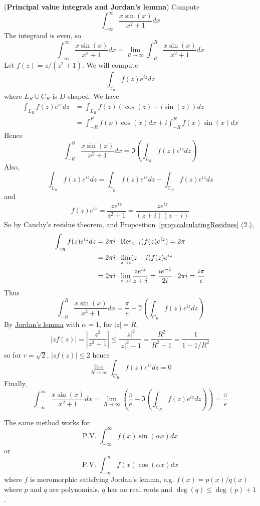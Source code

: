 \begin{example}
	(\textbf{Principal value integrals and Jordan's lemma}) Compute
	\[
		\int_{-\infty}^{\infty} \frac{x \sin(x)}{x^2 + 1} dx
	\]
	The integrand is even, so
	\[
		\int_{-\infty}^{\infty} \frac{x \sin(x)}{x^2 + 1} dx = \lim_{R \to \infty} \int_{-R}^{R} \frac{x \sin(x)}{x^2 + 1} dx
	\]
	Let $f(z) = z / (z^2 + 1)$. We will compute
	\[
		\int_{\gamma _R} f(z) e^{iz} dz
	\]
	where $L_R \cup C_R$ is $D$-shaped. We have
	\[
		\begin{aligned}
			\int_{L_R} f(z) e^{iz} dz & = \int_{L_R} f(z) (\cos(z) + i \sin(z)) dz \\
			& = \int_{-R}^{R} f(x) \cos(x) dx + i \int_{-R}^{R} f(x) \sin(x) dx
		\end{aligned}
	\]
	Hence
	\[
		\int_{-R}^{R} \frac{x \sin(x)}{x^2 + 1} dx = \Im\left( \int_{L_R} f(z) e^{iz} dz \right)
	\]
	Also,
	\[
		\int_{L_R} f(z) e^{iz} dz = \int_{\gamma_R} f(z) e^{iz} dz - \int_{C_R} f(z) e^{iz} dz
	\]
	and
	\[
		f(z) e^{iz} = \frac{z e^{iz}}{z^2 + 1} = \frac{z e^{iz}}{(z + i)(z - i)}
	\]
	So by Cauchy's residue theorem, and Proposition~\ref{prop:calculatingResidues} (2.),
	\[
		\begin{aligned}
			\int_{\gamma_R} f(z) e^{iz} dz & = 2 \pi i \cdot \text{Res}_{z = i} (f(z) e^{iz}) = 2 \pi \\
			& = 2 \pi i \cdot \lim_{z \to i} (z - i) f(z) e^{iz} \\
			& = 2 \pi i \cdot \lim_{z \to i} \frac{z e^{iz}}{z + i} = \frac{i e^{-1}}{2i} \cdot 2 \pi i = \frac{i\pi}{e}
		\end{aligned}
	\]
	Thus
	\[
		\int_{-R}^{R} \frac{x \sin(x)}{x^2 + 1} dx = \frac{\pi}{e} - \Im\left( \int_{C_R} f(z) e^{iz} dz \right)
	\]
	By \hyperref[lem:jordansLemma]{Jordan's lemma} with $\alpha = 1$, for $|z| = R$,
	\[
		|z f(z)| = \left| \frac{z^2}{z^2 + 1} \right| \le \frac{|z|^2}{|z|^2 - 1} = \frac{R^2}{R^2 - 1} = \frac{1}{1 - 1/R^2}
	\]
	so for $r = \sqrt{2}$, $|z f(z)| \le 2$ hence
	\[
		\lim_{R \to \infty} \int_{C_R} f(z) e^{iz} dz = 0
	\]
	Finally,
	\[
		\int_{-\infty}^{\infty} \frac{x \sin(x)}{x^2 + 1} dx = \lim_{R \to \infty} \left( \frac{\pi}{e} - \Im \left(\int_{C_R} f(z) e^{iz} dz \right) \right) = \frac{\pi}{e}
	\]
\end{example}

\begin{remark}
	The same method works for
	\[
		\text{P.V. } \int_{-\infty}^{\infty} f(x) \sin(\alpha x) dx
	\]
	or
	\[
		\text{P.V. } \int_{-\infty}^{\infty} f(x) \cos(\alpha x) dx
	\]
	where $f$ is meromorphic satisfying Jordan's lemma, e.g. $f(x) = p(x) / q(x)$ where $p$ and $q$ are polynomials, $q$ has no real roots and $\deg(q) \le \deg(p) + 1$.
\end{remark}

